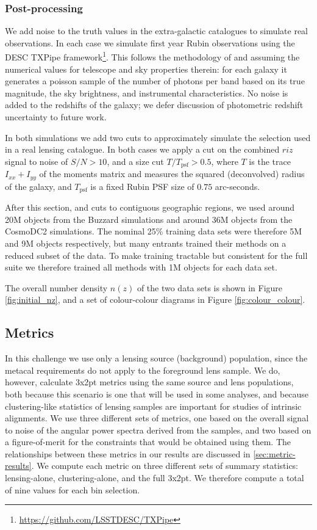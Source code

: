 \documentclass[twocolumn,twocolappendix]{aastex63}
\begin{document}
\subsubsection{Post-processing} \label{sec:data-proc}

We add noise to the truth values in the extra-galactic catalogues to simulate real observations.
In each case we simulate first year Rubin observations
using the DESC {\sc TXPipe} framework\footnote{\url{https://github.com/LSSTDESC/TXPipe}}.
This follows the methodology of \citet{ivezic_jones_lupton}
and assuming the numerical values for telescope and sky properties therein:
for each galaxy it generates a poisson sample of the number of photons per band based on
its true magnitude, the sky brightness, and instrumental characteristics.
No noise is added to the redshifts of the galaxy; we defer discussion of photometric
redshift uncertainty to future work.

In both simulations we add two cuts to approximately simulate the selection used in a real
lensing catalogue.  In both cases we apply a cut on the combined $riz$ signal to noise of
$S/N > 10$, and a size cut $T / T_\mathrm{psf} > 0.5$, where
$T$ is the trace $I_{xx} + I_{yy}$ of the moments matrix and measures the squared (deconvolved) 
radius of the
galaxy, and $T_\mathrm{psf}$ is a fixed Rubin PSF size of $0.75$ arc-seconds.

After this section, and cuts to contiguous geographic regions, we used around 20M objects from the Buzzard
simulations and around 36M objects from the CosmoDC2 simulations.  The nominal 25\% training data sets were therefore 5M and 9M objects respectively, but many entrants trained their methods on a reduced subset of the data. To make training tractable but consistent for the full suite we therefore trained all methods with 1M objects for each data set.

The overall number density $n(z)$ of the two data sets is shown in Figure \ref{fig:initial_nz},
and a set of colour-colour diagrams  in Figure \ref{fig:colour_colour}.

\subsection{Metrics}
\label{sec:metrics}

In this challenge we use only a lensing source (background) population, since the metacal requirements
do not apply to the foreground lens sample. We do, however, calculate 3x2pt metrics using the
same source and lens populations, both because this scenario is one that will be used in some analyses,
and because clustering-like statistics of lensing samples are important for studies of intrinsic
alignments. We use three different sets of metrics, one based on the overall signal to noise of the angular power spectra 
derived from the samples, and two based on a figure-of-merit for the constraints that would be obtained 
using them. The relationships between these metrics in our results are discussed in \autoref{sec:metric-results}.
We compute each metric on three different sets of summary statistics: lensing-alone, clustering-alone,
and the full 3x2pt. We therefore compute a total of nine values for each bin selection.
\end{document}
